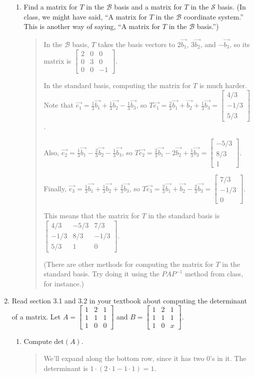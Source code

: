 \documentclass[letter]{article}
\newcommand{\Det}{\mathrm{det}}
\newcommand{\mat}[1]{\begin{bmatrix}#1\end{bmatrix}}
\begin{document}
\begin{enumerate}
\begin{enumerate}
				\item Find a matrix for $T$ in the $\mathcal B$ basis  and a matrix for $T$ in
					the $\mathcal S$ basis. (In class, we might have said, ``A matrix for
					$T$ in the $\mathcal B$ coordinate system.''  This is another way of 
					saying, ``A matrix for $T$ in the $\mathcal B$ basis.'')
				\begin{quote}
					In the $\mathcal{B}$ basis, $T$ takes the basis vectors to $2 \vec{b_1}$, $3 \vec{b_2}$, and $- \vec{b_3}$, so its matrix is $\mat{2 & 0 & 0 \\ 0 & 3 & 0 \\ 0 & 0 & -1}$.
					
					In the standard basis, computing the matrix for $T$ is much harder.  Note that $\vec{e_1} = \frac{1}{3} \vec{b_1} + \frac{1}{3} \vec{b_2} - \frac{1}{3} \vec{b_3}$, so $T \vec{e_1} = \frac{2}{3} \vec{b_1} + \vec{b_2} + \frac{1}{3} \vec{b_3} = \mat{4/3\\-1/3\\5/3}$.
					
					Also, $\vec{e_2} = \frac{1}{3} \vec{b_1} - \frac{2}{3} \vec{b_2} - \frac{1}{3} \vec{b_3}$, so $T \vec{e_2} = \frac{2}{3} \vec{b_1} - 2 \vec{b_2} + \frac{1}{3} \vec{b_3} = \mat{-5/3 \\ 8/3 \\ 1}$.
					
					Finally, $\vec{e_3} = \frac{1}{3} \vec{b_1} + \frac{1}{3} \vec{b_2} + \frac{2}{3} \vec{b_3}$, so $T \vec{e_3} = \frac{2}{3} \vec{b_1} + \vec{b_2} - \frac{2}{3} \vec{b_3} = \mat{7/3 \\ -1/3 \\ 0}$.
					
					This means that the matrix for $T$ in the standard basis is $\mat{4/3 & -5/3 & 7/3 \\ -1/3 & 8/3 & -1/3 \\ 5/3 & 1 & 0}$.
					
					(There are other methods for computing the matrix for $T$ in the standard basis.  Try doing it using the $PAP^{-1}$ method from class, for instance.)
				\end{quote}

			\end{enumerate}
		
		\item Read section 3.1 and 3.2 in your textbook about computing the determinant of a matrix.
			Let $A=\mat{1&2&1\\1&1&1\\1&0&0}$ and $B=\mat{1&2&1\\1&1&1\\1&0&x}$.
		\begin{enumerate}
			\item Compute $\Det(A)$.
				\begin{quote}
					We'll expand along the bottom row, since it has two 0's in it.  The determinant is $1 \cdot (2 \cdot 1 - 1 \cdot 1) = 1$.
				\end{quote}


\end{enumerate}
\end{enumerate}
\end{document}

